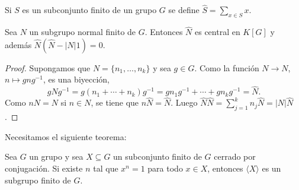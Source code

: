 %

Si $S$ es un subconjunto finito de un grupo $G$ se define
$\widehat{S}=\sum_{x\in S}x$. 

\begin{lemma}
	\label{lemma:sumN}
	Sea $N$ un subgrupo normal finito de $G$. Entonces $\widehat{N}$ es central
	en $K[G]$ y además $\widehat{N}(\widehat{N}-|N|1)=0$.
\end{lemma}

\begin{proof}
	Supongamos que $N=\{n_1,\dots,n_k\}$ y 
	sea $g\in G$. Como la función $N\to N$, $n\mapsto gng^{-1}$, es una biyección, 
	\[
		g\widehat{N}g^{-1}=g(n_1+\cdots+n_k)g^{-1}=gn_1g^{-1}+\cdots+gn_kg^{-1}=\widehat{N}.
	\]
	Como $nN=N$ si $n\in N$, se tiene que $n\widehat{N}=\widehat{N}$. Luego
	$\widehat{N}\widehat{N}=\sum_{j=1}^k n_j\widehat{N}=|N|\widehat{N}$.
\end{proof}

Necesitamos el siguiente teorema:

\begin{theorem}[Dietzmann]
	\label{theorem:Dietzmann} 
	Sea $G$ un grupo y sea $X\subseteq G$ un
	subconjunto finito de $G$ cerrado por conjugación. Si existe $n$ tal
	que $x^n=1$ para todo $x\in X$, entonces $\langle X\rangle$ es un subgrupo
	finito de $G$.
\end{theorem}

